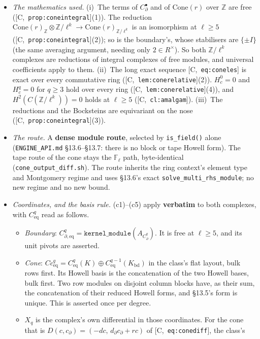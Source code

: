 \documentclass[11pt]{article}
\theoremstyle{remark}
\newcommand{\F}{\mathbb{F}}
\newcommand{\Z}{\mathbb{Z}}
\newcommand{\Fl}{\F_\ell}
\newcommand{\HA}[1]{[C,~\texttt{#1}]}      %
\begin{document}
\begin{itemize}
\item \emph{The mathematics used.} (i)~The terms of $C^{\bullet}_{\partial}$ and of
  $\mathrm{Cone}(r)$ over $\Z$ are free (\HA{prop:coneintegral}(1)). The reduction
  $\mathrm{Cone}(r)_{\Z}\otimes\Z/\ell^k\to\mathrm{Cone}(r)_{\Z/\ell^k}$ is an isomorphism at
  $\ell\ge5$ (\HA{prop:coneintegral}(2)); so is the boundary's, whose stabilisers are $\{\pm I\}$
  (the same averaging argument, needing only $2\in R^{\times}$). So both $\Z/\ell^k$ complexes are
  reductions of integral complexes of free modules, and universal coefficients apply to them.
  (ii)~The long exact sequence \HA{eq:coneles} is exact over every commutative ring
  (\HA{lem:conerelative}(2)). $H^0_c=0$ and $H^q_c=0$ for $q\ge3$ hold over every ring
  (\HA{lem:conerelative}(4)), and $H^2(C(\Z/\ell^k))=0$ holds at $\ell\ge5$ (\HA{cl:amalgam}). (iii)~The
  reductions and the Bocksteins are equivariant on the nose (\HA{prop:coneintegral}(3)).
\item \emph{The route.} A \textbf{dense module route}, selected by \texttt{is\_field()} alone
  (\texttt{ENGINE\_API.md} \S13.6--\S13.7: there is no block or tape Howell form). The tape route
  of the cone stays the $\Fl$ path, byte-identical (\texttt{cone\_output\_diff.sh}). The route
  inherits the ring context's element type and Montgomery regime and uses \S13.6's exact
  \texttt{solve\_multi\_rhs\_module}; no new regime and no new bound.
\item \emph{Coordinates, and the basis rule.} (c1)--(c5) apply \textbf{verbatim} to both complexes,
  with $C^q_{\mathrm{eq}}$ read as follows.
  \begin{itemize}
  \item \emph{Boundary}: $C^q_{\partial,\mathrm{eq}}=\texttt{kernel\_module}(A_{C^q_{\partial}})$.
    It is free at $\ell\ge5$, and its unit pivots are asserted.
  \item \emph{Cone}: $Cc^q_{\mathrm{eq}}=C^q_{\mathrm{eq}}(K)\oplus C^{q-1}_{\mathrm{eq}}(K_{\mathrm{bd}})$
    in the class's flat layout, bulk rows first. Its Howell basis is the concatenation of the two
    Howell bases, bulk first. Two row modules on disjoint column blocks have, as their sum, the
    concatenation of their reduced Howell forms, and \S13.5's form is unique. This is asserted
    once per degree.
  \item $X_q$ is the complex's own differential in those coordinates. For the cone that is
    $D(c,c_{\partial})=(-dc,\,d_{\partial}c_{\partial}+rc)$ of \HA{eq:conediff}, the class's

\end{itemize}
\end{itemize}
\end{document}
